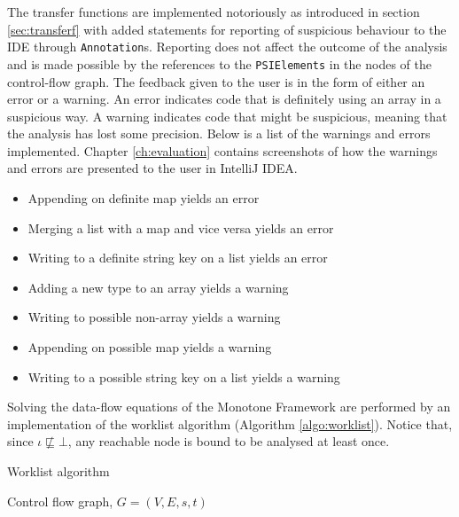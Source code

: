 The transfer functions are implemented notoriously as introduced in section \ref{sec:transferf} with added statements for reporting of suspicious behaviour to the IDE through \texttt{Annotation}s. Reporting does not affect the outcome of the analysis and is made possible by the references to the \texttt{PSIElements} in the nodes of the control-flow graph. The feedback given to the user is in the form of either an error or a warning. An error indicates code that is definitely using an array in a suspicious way. A warning indicates code that might be suspicious, meaning that the analysis has lost some precision. Below is a list of the warnings and errors implemented. Chapter \ref{ch:evaluation} contains screenshots of how the warnings and errors are presented to the user in IntelliJ IDEA.
\begin{itemize}
\item Appending on definite map yields an error
\item Merging a list with a map and vice versa yields an error
\item Writing to a definite string key on a list yields an error
\item Adding a new type to an array yields a warning
\item Writing to possible non-array yields a warning
\item Appending on possible map yields a warning
\item Writing to a possible string key on a list yields a warning
\end{itemize}

Solving the data-flow equations of the Monotone Framework are performed by an implementation of the worklist algorithm (Algorithm \ref{algo:worklist}). Notice that, since $\iota \not\sqsubseteq \bot$, any reachable node is bound to be analysed at least once. 

\begin{algorithm}
\caption{Worklist algorithm}
\label{algo:worklist}
\begin{algorithmic}[1]
\scriptsize
\Require Control flow graph, $G=(V,E,s,t)$
	
		
		
	\EndIf
	
\EndWhile
\end{algorithmic}
\end{algorithm}

